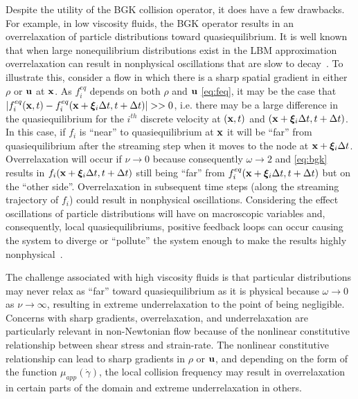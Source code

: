 Despite the utility of the BGK collision operator, it does have a few drawbacks.
For example, in low viscosity fluids, the BGK operator results in an overrelaxation of particle distributions toward quasiequilibrium.
It is well known that when large nonequilibrium distributions exist in the LBM approximation overrelaxation can result in nonphysical oscillations that are slow to decay~\cite{brownlee2007stability,dellar2003incompressible}.
To illustrate this, consider a flow in which there is a sharp spatial gradient in either $\rho$ or $\mathbf{u}$ at $\mathbf{x}$.
As $f_i^{eq}$ depends on both $\rho$ and $\mathbf{u}$ \eqref{eq:feq}, it may be the case that $|f_i^{eq}(\mathbf{x}, t) - f_i^{eq}(\mathbf{x} + \boldsymbol{\xi}_i \Delta t, t + \Delta t)| >> 0$, i.e. there may be a large difference in the quasiequilibrium for the $i^{th}$ discrete velocity at $(\mathbf{x}, t)$ and $(\mathbf{x} + \boldsymbol{\xi}_i \Delta t, t + \Delta t)$.
In this case, if $f_i$ is ``near'' to quasiequilibrium at $\mathbf{x}$ it will be ``far'' from quasiequilibrium after the streaming step when it moves to the node at $\mathbf{x} + \boldsymbol{\xi}_i \Delta t$.
Overrelaxation will occur if $\nu \rightarrow 0$ because consequently $\omega \rightarrow 2$ and \eqref{eq:bgk} results in $f_i(\mathbf{x} + \boldsymbol{\xi}_i \Delta t,t + \Delta t)$ still being ``far'' from $f^{eq}_i(\mathbf{x} + \boldsymbol{\xi}_i \Delta t,t + \Delta t)$ but on the ``other side''.
Overrelaxation in subsequent time steps (along the streaming trajectory of $f_i$) could result in nonphysical oscillations.
Considering the effect oscillations of particle distributions will have on macroscopic variables and, consequently, local quasiequilibriums, positive feedback loops can occur causing the system to diverge or ``pollute'' the system enough to make the results highly nonphysical~\cite{gorban2014enhancement}.

The challenge associated with high viscosity fluids is that particular distributions may never relax as ``far'' toward quasiequilibrium as it is physical because $\omega \rightarrow 0$ as $\nu \rightarrow \infty$, resulting in extreme underrelaxation to the point of being negligible.
Concerns with sharp gradients, overrelaxation, and underrelaxation are particularly relevant in non-Newtonian flow because of the nonlinear constitutive relationship between shear stress and strain-rate.
The nonlinear constitutive relationship can lead to sharp gradients in $\rho$ or $\mathbf{u}$, and depending on the form of the function $\mu_{app}(\dot{\gamma})$, the local collision frequency may result in overrelaxation in certain parts of the domain and extreme underrelaxation in others.

